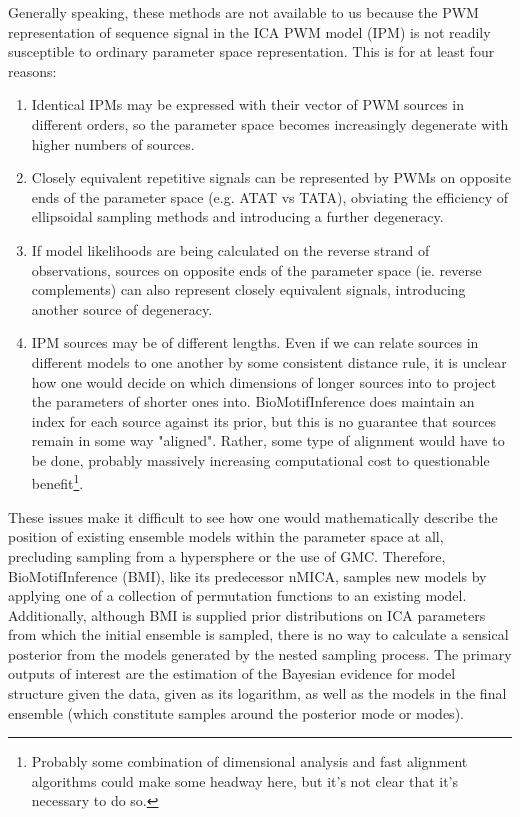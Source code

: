 Generally speaking, these methods are not available to us because the PWM representation of sequence signal in the ICA PWM model (IPM) is not readily susceptible to ordinary parameter space representation. This is for at least four reasons:

\begin{enumerate}
    \item Identical IPMs may be expressed with their vector of PWM sources in different orders, so the parameter space becomes increasingly degenerate with higher numbers of sources.
    \item Closely equivalent repetitive signals can be represented by PWMs on opposite ends of the parameter space (e.g. ATAT vs TATA), obviating the efficiency of ellipsoidal sampling methods and introducing a further degeneracy.
    \item If model likelihoods are being calculated on the reverse strand of observations, sources on opposite ends of the parameter space (ie. reverse complements) can also represent closely equivalent signals, introducing another source of degeneracy.
    \item IPM sources may be of different lengths. Even if we can relate sources in different models to one another by some consistent distance rule, it is unclear how one would decide on which dimensions of longer sources into to project the parameters of shorter ones into. BioMotifInference does maintain an index for each source against its prior, but this is no guarantee that sources remain in some way "aligned". Rather, some type of alignment would have to be done, probably massively increasing computational cost to questionable benefit\footnote{Probably some combination of dimensional analysis and fast alignment algorithms could make some headway here, but it's not clear that it's necessary to do so.}.
\end{enumerate}

These issues make it difficult to see how one would mathematically describe the position of existing ensemble models within the parameter space at all, precluding sampling from a hypersphere or the use of GMC. Therefore, BioMotifInference (BMI), like its predecessor nMICA, samples new models by applying one of a collection of permutation functions to an existing model. Additionally, although BMI is supplied prior distributions on ICA parameters from which the initial ensemble is sampled, there is no way to calculate a sensical posterior from the models generated by the nested sampling process. The primary outputs of interest are the estimation of the Bayesian evidence for model structure given the data, given as its logarithm, as well as the models in the final ensemble (which constitute samples around the posterior mode or modes).

